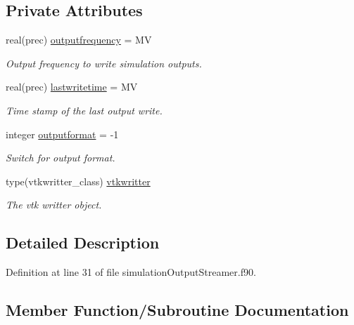 \subsection*{Private Attributes}
\begin{DoxyCompactItemize}
\item 
real(prec) \mbox{\hyperlink{structsimulationoutputstreamer__mod_1_1output__streamer__class_a920e9e77fa191ab17e85c82d3816d913}{outputfrequency}} = MV
\begin{DoxyCompactList}\small\item\em Output frequency to write simulation outputs. \end{DoxyCompactList}\item 
real(prec) \mbox{\hyperlink{structsimulationoutputstreamer__mod_1_1output__streamer__class_a9ea996af0c9a2d9f3930092e83ca71bb}{lastwritetime}} = MV
\begin{DoxyCompactList}\small\item\em Time stamp of the last output write. \end{DoxyCompactList}\item 
integer \mbox{\hyperlink{structsimulationoutputstreamer__mod_1_1output__streamer__class_a53a4af6464bb24e7191a7632fb3b4f38}{outputformat}} = -\/1
\begin{DoxyCompactList}\small\item\em Switch for output format. \end{DoxyCompactList}\item 
type(vtkwritter\+\_\+class) \mbox{\hyperlink{structsimulationoutputstreamer__mod_1_1output__streamer__class_a883916a5ede4ceff754115bd3317649e}{vtkwritter}}
\begin{DoxyCompactList}\small\item\em The vtk writter object. \end{DoxyCompactList}\end{DoxyCompactItemize}


\subsection{Detailed Description}


Definition at line 31 of file simulation\+Output\+Streamer.\+f90.



\subsection{Member Function/\+Subroutine Documentation}
\mbox{\label{structsimulationoutputstreamer__mod_1_1output__streamer__class_a2085a877c0b95c662c0012d911e34c58}} 
